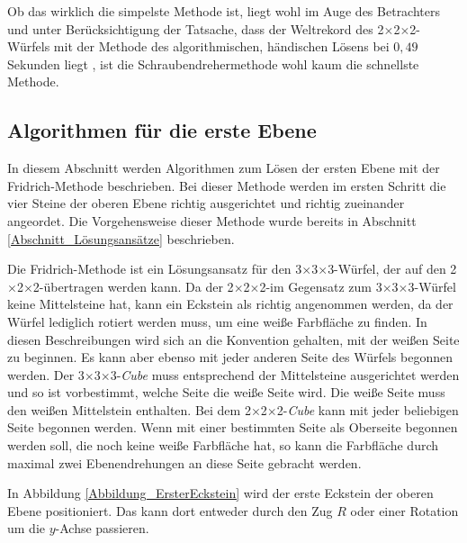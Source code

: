 \documentclass[12pt,a4paper, usenames, dvipsnames]{article}
\theoremstyle{mystyle}
\theoremstyle{definition}
\newcommand{\Ttwo}{2$\times$2$\times$2-}
\newcommand{\Tthree}{3$\times$3$\times$3-}
\begin{document}
Ob das wirklich die simpelste Methode ist, liegt wohl im Auge des Betrachters und unter Berücksichtigung der Tatsache, dass der Weltrekord des \Ttwo Würfels mit der Methode des algorithmischen, händischen Lösens bei $0,49$ Sekunden liegt \cite{rekord}, ist die Schraubendrehermethode wohl kaum die schnellste Methode.

%
%
%
%
%
%
%
%
%
%
%
%
%
%
%
%
%
%
%
\subsection{Algorithmen für die erste Ebene}
\label{Abschnitt_AlgorithmenErsteEbene}

In diesem Abschnitt werden Algorithmen zum Lösen der ersten Ebene mit der Fridrich-Methode beschrieben. Bei dieser Methode werden im ersten Schritt die vier Steine der oberen Ebene richtig ausgerichtet und richtig zueinander angeordet. Die Vorgehensweise dieser Methode wurde bereits in Abschnitt \ref{Abschnitt_Lösungsansätze} beschrieben. 

Die Fridrich-Methode ist ein Lösungsansatz für den \Tthree Würfel, der auf den \Ttwo übertragen werden kann.
Da der \Ttwo im Gegensatz zum \Tthree Würfel keine Mittelsteine hat, kann ein Eckstein als richtig angenommen werden, da der Würfel lediglich rotiert werden muss, um eine weiße Farbfläche zu finden.
In diesen Beschreibungen wird sich an die Konvention gehalten, mit der weißen Seite zu beginnen. Es kann aber ebenso mit jeder anderen Seite des Würfels begonnen werden.
Der \Tthree \textit{Cube} muss entsprechend der Mittelsteine ausgerichtet werden und so ist vorbestimmt, welche Seite die weiße Seite wird. Die weiße Seite muss den weißen Mittelstein enthalten. 
Bei dem \Ttwo \textit{Cube} kann mit jeder beliebigen Seite begonnen werden. Wenn mit einer bestimmten Seite als Oberseite begonnen werden soll, die noch keine weiße Farbfläche hat, so kann die Farbfläche durch maximal zwei Ebenendrehungen an diese Seite gebracht werden.

In Abbildung \ref{Abbildung_ErsterEckstein} wird der erste Eckstein der oberen Ebene positioniert. Das kann dort entweder durch den Zug $R$ oder einer Rotation um die $y$-Achse passieren.
\end{document}
